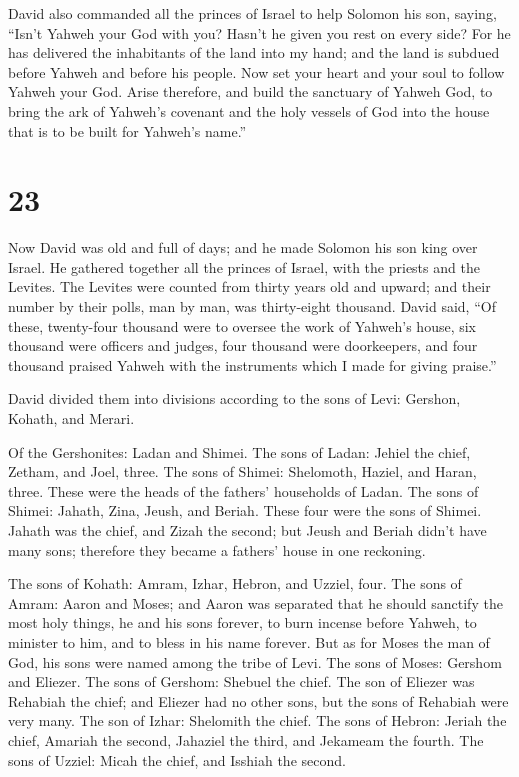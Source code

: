  David also commanded all the princes of Israel to help
Solomon his son, saying,  ``Isn't Yahweh your God with you?
Hasn't he given you rest on every side? For he has delivered the
inhabitants of the land into my hand; and the land is subdued before
Yahweh and before his people.  Now set your heart and your
soul to follow Yahweh your God. Arise therefore, and build the sanctuary
of Yahweh God, to bring the ark of Yahweh's covenant and the holy
vessels of God into the house that is to be built for Yahweh's name.''

\hypertarget{section-22}{%
\section{23}\label{section-22}}

 Now David was old and full of days; and he made Solomon his
son king over Israel.  He gathered together all the princes
of Israel, with the priests and the Levites.  The Levites
were counted from thirty years old and upward; and their number by their
polls, man by man, was thirty-eight thousand.  David said,
``Of these, twenty-four thousand were to oversee the work of Yahweh's
house, six thousand were officers and judges,  four thousand
were doorkeepers, and four thousand praised Yahweh with the instruments
which I made for giving praise.''

 David divided them into divisions according to the sons of
Levi: Gershon, Kohath, and Merari.

 Of the Gershonites: Ladan and Shimei.  The sons
of Ladan: Jehiel the chief, Zetham, and Joel, three.  The
sons of Shimei: Shelomoth, Haziel, and Haran, three. These were the
heads of the fathers' households of Ladan.  The sons of
Shimei: Jahath, Zina, Jeush, and Beriah. These four were the sons of
Shimei.  Jahath was the chief, and Zizah the second; but
Jeush and Beriah didn't have many sons; therefore they became a fathers'
house in one reckoning.

 The sons of Kohath: Amram, Izhar, Hebron, and Uzziel,
four.  The sons of Amram: Aaron and Moses; and Aaron was
separated that he should sanctify the most holy things, he and his sons
forever, to burn incense before Yahweh, to minister to him, and to bless
in his name forever.  But as for Moses the man of God, his
sons were named among the tribe of Levi.  The sons of
Moses: Gershom and Eliezer.  The sons of Gershom: Shebuel
the chief.  The son of Eliezer was Rehabiah the chief; and
Eliezer had no other sons, but the sons of Rehabiah were very many.
 The son of Izhar: Shelomith the chief.  The
sons of Hebron: Jeriah the chief, Amariah the second, Jahaziel the
third, and Jekameam the fourth.  The sons of Uzziel: Micah
the chief, and Isshiah the second.

